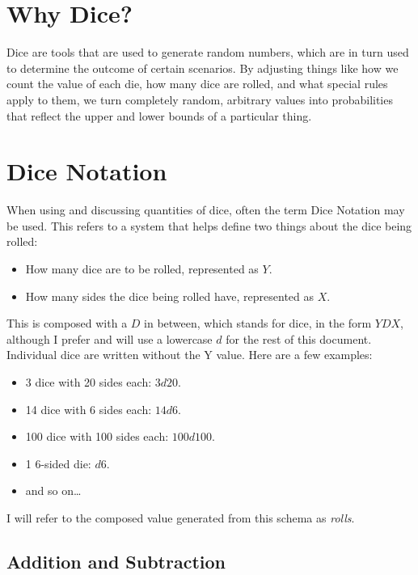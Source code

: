 \documentclass[../main.tex]{subfiles}
\begin{document}
    \setlength{\headheight}{2cm}
    \addtolength{\topmargin}{-2cm}

    \section{Why Dice?}

    Dice are tools that are used to generate random numbers, which are in turn used to determine the outcome of certain scenarios. By adjusting things like how we count the value of each die, how many dice are rolled, and what special rules apply to them, we turn completely random, arbitrary values into probabilities that reflect the upper and lower bounds of a particular thing.

    \section{Dice Notation}

    When using and discussing quantities of dice, often the term Dice Notation may be used. This refers to a system that helps define two things about the dice being rolled:

    \begin{itemize}
        \item How many dice are to be rolled, represented as $Y$.
        \item How many sides the dice being rolled have, represented as $X$.
    \end{itemize}

    This is composed with a $D$ in between, which stands for dice, in the form $YDX$, although I prefer and will use a lowercase $d$ for the rest of this document. Individual dice are written without the Y value. Here are a few examples:

    \begin{itemize}
        \item 3 dice with 20 sides each: $3d20$.
        \item 14 dice with 6 sides each: $14d6$.
        \item 100 dice with 100 sides each: $100d100$.
        \item 1 6-sided die: $d6$.
        \item and so on\dots
    \end{itemize}

    I will refer to the composed value generated from this schema as {\em rolls}.

    \subsection{Addition and Subtraction}
\end{document}
